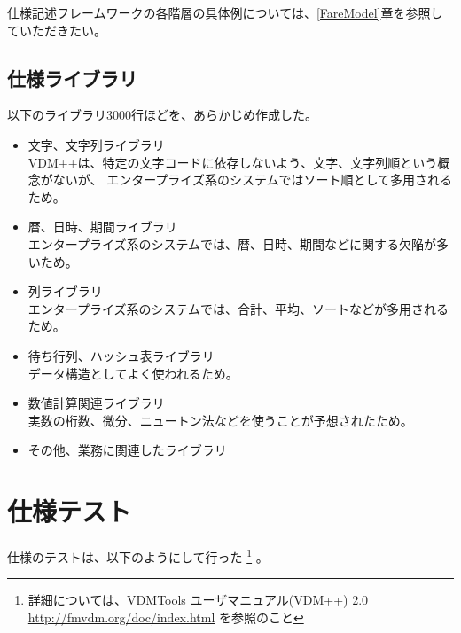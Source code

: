 	仕様記述フレームワークの各階層の具体例については、\ref{FareModel}章を参照していただきたい。

\subsection{仕様ライブラリ}
	\label{SpecLibrary}

	以下のライブラリ3000行ほどを、あらかじめ作成した。

	\begin{itemize}
	\item 文字、文字列ライブラリ \\
		VDM++は、特定の文字コードに依存しないよう、文字、文字列順という概念がないが、
		エンタープライズ系のシステムではソート順として多用されるため。
	\item 暦、日時、期間ライブラリ \\
		エンタープライズ系のシステムでは、暦、日時、期間などに関する欠陥が多いため。
	\item 列ライブラリ \\
		エンタープライズ系のシステムでは、合計、平均、ソートなどが多用されるため。
	\item 待ち行列、ハッシュ表ライブラリ \\
		データ構造としてよく使われるため。
	\item 数値計算関連ライブラリ \\
		実数の桁数、微分、ニュートン法などを使うことが予想されたため。
	\item その他、業務に関連したライブラリ
	\end{itemize}

\section{仕様テスト}
	\label{SpecTest}

	仕様のテストは、以下のようにして行った
	\footnote{詳細については、VDMTools ユーザマニュアル(VDM++) 2.0
		{\url{http://fmvdm.org/doc/index.html}}
	を参照のこと}
	。

